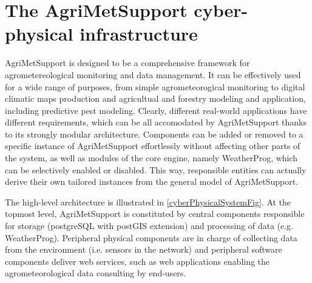 \documentclass[authoryear,preprint,review,12pt]{elsarticle}
\begin{document}
\section{The AgriMetSupport cyber-physical infrastructure} \label{sec:gci}

AgriMetSupport is designed to be a comprehensive framework for agrometereological monitoring and data management.
It can be effectively used for a wide range of purposes, from simple agrometeorogical monitoring to digital climatic maps production and agricultual and forestry modeling and application, including predictive pest modeling.
Clearly, different real-world applications have different requirements, which can be all accomodated by AgriMetSupport thanks to its strongly modular architecture.
Components can be added or removed to a specific instance of AgriMetSupport effortlessly without affecting other parts of the system, as well as modules of the core engine, namely WeatherProg, which can be selectively enabled or disabled.
This way, responsible entities can actually derive their own tailored instances from the general model of AgriMetSupport.

The high-level architecture is illustrated in \cref{cyberPhysicalSystemFig}.
At the topmost level, AgriMetSupport is constituted by central components responsible for storage (postgreSQL with postGIS extension) and processing of data (e.g. WeatherProg).
Peripheral physical components are in charge of collecting data from the environment (i.e. sensors in the network) and peripheral software components deliver web services, such as web applications enabling the agrometeorological data consulting by end-users.
\end{document}
